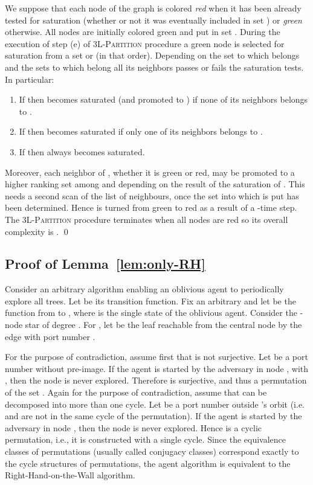 \documentclass[11pt,envcountsame,oribibl]{llncs}
\begin{document}
We suppose that each node of the graph is colored {\em red} when it has been already
tested for saturation (whether or not it was eventually included in set ) or
{\em green} otherwise. All nodes are initially colored green and put in set .
During the execution of step (e) of \textsc{3L-Partition} procedure a green node
 is selected for saturation from a set  or  (in that order). Depending
on the set to which belongs  and the sets to which belong all its neighbors 
passes or fails the saturation tests. In particular:
\begin{enumerate}
 \item If  then  becomes saturated (and promoted to ) if none of
 its neighbors belongs to .
 \item If  then  becomes saturated if only one of its neighbors
 belongs to .
 \item If  then  always becomes saturated.
\end{enumerate}
Moreover, each neighbor of , whether it is green or red, may be promoted to a
higher ranking set among  and  depending on the result of the saturation
of . This needs a second scan of the list of neighbours,
once the set into which  is put has been determined. Hence  is turned from
green to red as a result of a -time step. The \textsc{3L-Partition} procedure
terminates when all nodes are red so its overall complexity is . \hfill\qed

\subsection{Proof of Lemma~\ref{lem:only-RH}}

  Consider an arbitrary algorithm  enabling an oblivious agent to
  periodically explore all trees. Let  be its transition
  function. Fix an arbitrary  and let  be the function
   from  to , where
   is the single state of the oblivious agent. Consider the
  -node star of degree . For , let  be
  the leaf reachable from the central node  by the edge with port
  number .

  For the purpose of contradiction, assume first that  is not
  surjective. Let  be a port number without pre-image. If the agent
  is started by the adversary in node , with , then the
  node  is never explored. Therefore  is surjective, and
  thus a permutation of the set . Again for the purpose
  of contradiction, assume that  can be decomposed into more than
  one cycle. Let  be a port number outside 's orbit (i.e. 
  and  are not in the same cycle of the permutation). If the agent
  is started by the adversary in node , then the node  is
  never explored. Hence  is a cyclic permutation, i.e., it is
  constructed with a single cycle. Since the equivalence classes of
  permutations (usually called conjugacy classes) correspond exactly
  to the cycle structures of permutations, the agent algorithm 
  is equivalent to the Right-Hand-on-the-Wall algorithm.
\end{document}
